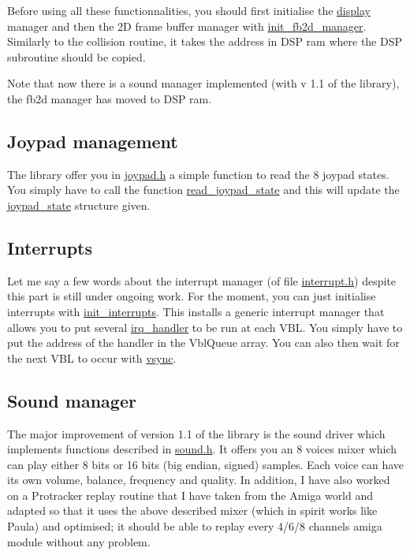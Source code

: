 Before using all these functionnalities, you should first initialise the \hyperlink{structdisplay}{display} manager and then the 2D frame buffer manager with \hyperlink{fb2d_8h_503d0b9fdd2ece9497058abe9ebeeeb1}{init\_\-fb2d\_\-manager}. Similarly to the collision routine, it takes the address in DSP ram where the DSP subroutine should be copied.

Note that now there is a sound manager implemented (with v 1.1 of the library), the fb2d manager has moved to DSP ram.\hypertarget{index_joy_subsec}{}\subsection{Joypad management}\label{index_joy_subsec}
The library offer you in \hyperlink{joypad_8h}{joypad.h} a simple function to read the 8 joypad states. You simply have to call the function \hyperlink{joypad_8h_4a358412f2f5f060dc86184bfa4e1ec3}{read\_\-joypad\_\-state} and this will update the \hyperlink{structjoypad__state}{joypad\_\-state} structure given.\hypertarget{index_inter_subsec}{}\subsection{Interrupts}\label{index_inter_subsec}
Let me say a few words about the interrupt manager (of file \hyperlink{interrupt_8h}{interrupt.h}) despite this part is still under ongoing work. For the moment, you can just initialise interrupts with \hyperlink{interrupt_8h_88ada49c1954d38252049786595d9a5f}{init\_\-interrupts}. This installs a generic interrupt manager that allows you to put several \hyperlink{interrupt_8h_5b5f4eb5a4f31f7bb28052d16a53c799}{irq\_\-handler} to be run at each VBL. You simply have to put the address of the handler in the VblQueue array. You can also then wait for the next VBL to occur with \hyperlink{interrupt_8h_cc0884f2032458e434145e6f082c370f}{vsync}.\hypertarget{index_modplay_subsec}{}\subsection{Sound manager}\label{index_modplay_subsec}
The major improvement of version 1.1 of the library is the sound driver which implements functions described in \hyperlink{sound_8h}{sound.h}. It offers you an 8 voices mixer which can play either 8 bits or 16 bits (big endian, signed) samples. Each voice can have its own volume, balance, frequency and quality. In addition, I have also worked on a Protracker replay routine that I have taken from the Amiga world and adapted so that it uses the above described mixer (which in spirit works like Paula) and optimised; it should be able to replay every 4/6/8 channels amiga module without any problem.

